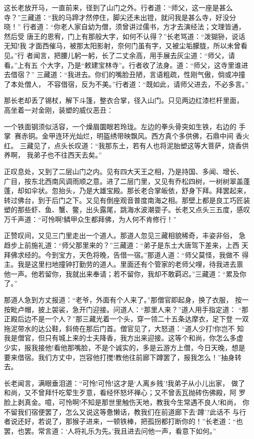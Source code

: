 这长老放开马，一直前来，径到了山门之外。行者道：“师父，这一座是甚么
寺？”三藏道：“我的马蹄才然停住，脚尖还未出镫，就问我是甚么寺，好没分晓！”
行者道：“你老人家自幼为僧，须曾讲过儒书，方才去演经法；文理皆通，然后受
唐王的恩宥，门上有那般大字，如何不认得？”长老骂道：“泼猢狲，说话无知!我
才面西催马，被那太阳影射，奈何门虽有字，又被尘垢朦胧，所以未曾看见。”行
者闻言，把腰儿躬一躬，长了二丈余高，用手展去灰尘道：“师父，请看。”上有五
个大字，乃是“敕建宝林寺”。行者收了法身。道：“师父，这寺里谁进去借宿？”
三藏道：“我进去。你们的嘴脸丑陋，言语粗疏，性刚气傲，倘或冲撞了本处僧人，
不容借宿，反为不美。”行者道：“既如此，请师父进去，不必多言。”

那长老却丢了锡杖，解下斗篷，整衣合掌，径入山门。只见两边红漆栏杆里面，
高坐着一对金刚，装塑的威仪恶丑：

一个铁面钢须似活容，一个燥眉圜眼若玲珑。左边的拳头骨突如生铁，右边的
手掌赛赤铜。金甲连环光灿烂，明盔绣带映飘风。西方真个多供佛，石鼎中间
香火红。
三藏见了，点头长叹道：“我那东土，若有人也将泥胎塑这等大菩萨，烧香供养啊，
我弟子也不往西天去矣。”

正叹息处，又到了二层山门之内。见有四大天王之相，乃是持国、多闻、增长、
广目，按东北西南风调雨顺之意。进了二层门里，又见有乔松四树，一树树翠盖蓬
蓬，却如伞状。忽抬头，乃是大雄宝殿。那长老合掌皈依，舒身下拜。拜罢起来，
转过佛台，到于后门之下。又见有倒座观音普度南海之相。那壁上都是良工巧匠装
塑的那些虾、鱼、蟹、鳖，出头露尾，跳海水波潮耍子。长老又点头三五度，感叹
万千声道：“可怜啊!鳞甲众生都拜佛，为人何不肯修行！”

正赞叹间，又见三门里走出一个道人。那道人忽见三藏相貌稀奇，丰姿非俗，
急趋步上前施礼道：“师父那里来的？”三藏道：“弟子是东土大唐驾下差来，上西
天拜佛求经的。今到宝方，天色将晚，告借一宿。”那道人道：“师父莫怪，我做不
得主。我是这里扫地撞钟打勤劳的道人。里面还有个管家的老师父哩，待我进去禀
他一声。他若留你，我就出来奉请；若不留你，我却不敢羁迟。”三藏道：“累及你
了。”

那道人急到方丈报道：“老爷，外面有个人来了。”那僧官即起身，换了衣服，
按一按毗卢帽，披上袈裟，急开门迎接。问道人：“那里人来？”道人用手指定道：
“那正殿后边不是一个人？”那三藏光着一个头，穿一领二十五条达摩衣，足下登
一双拖泥带水的达公鞋，斜倚在那后门首。僧官见了，大怒道：“道人少打!你岂不
知我是僧官，但只有城上来的士夫降香，我方出来迎接。这等个和尚，你怎么多虚
少实，报我接他!看他那嘴脸，不是个诚实的，多是云游方上僧，今日天晚，想是
要来借宿。我们方丈中，岂容他打搅!教他往前廊下蹲罢了，报我怎么！”抽身转去。

长老闻言，满眼垂泪道：“可怜!可怜!这才是‘人离乡贱’!我弟子从小儿出家，
做了和尚，又不曾拜忏吃荤生歹意，看经怀怒坏禅心；又不曾丢瓦抛砖伤佛殿，阿
罗脸上剥真金。噫，可怜啊!不知是那世里触伤天地，教我今生常遇不良人!和尚，
你不留我们宿便罢了，怎么又说这等惫懒话，教我们在前道廊下去‘蹲’?此话不
与行者说还好，若说了，那猴子进来，一顿铁棒，把孤拐都打断你的！”长老道：“也
罢，也罢。常言道：‘人将礼乐为先。’我且进去问他一声，看意下如何。”

